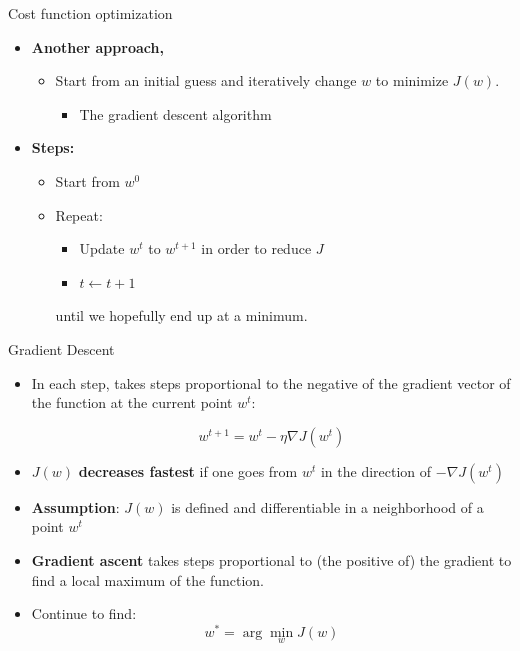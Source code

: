 \documentclass[serif, aspectratio=169]{beamer}
\begin{document}
\begin{frame}{Cost function optimization}

\begin{itemize}
    \item \textbf{Another approach,}
    \begin{itemize}
        \item Start from an initial guess and iteratively change \( w \) to minimize \( J(w) \).
        \begin{itemize}
            \item The gradient descent algorithm
        \end{itemize}
    \end{itemize}
    
    \item \textbf{Steps:}
    \begin{itemize}
        \item Start from \( w^0 \)
        \item Repeat:
        \begin{itemize}
            \item Update \( w^t \) to \( w^{t+1} \) in order to reduce \( J \)
            \item \( t \leftarrow t + 1 \)
        \end{itemize}
        until we hopefully end up at a minimum.
    \end{itemize}
\end{itemize}

\end{frame}



\begin{frame}{Gradient Descent}

    \begin{itemize}
        \item In each step, takes steps proportional to the negative of the gradient vector of the function at the current point \( w^t \):
        
        \[
        w^{t+1} = w^t - \eta \nabla J(w^t)
        \]
        
        \item \( J(w) \) \textbf{decreases fastest} if one goes from \( w^t \) in the direction of \( -\nabla J(w^t) \)
        
        \item \textbf{Assumption}: \( J(w) \) is defined and differentiable in a neighborhood of a point \( w^t \)
        
        \item \textbf{Gradient ascent} takes steps proportional to (the positive of) the gradient to find a local maximum of the function.
        
        \item Continue to find:
        \[
        w^* = \arg \min_w J(w)
        \]
    
    \end{itemize}

\end{frame}
\end{document}
